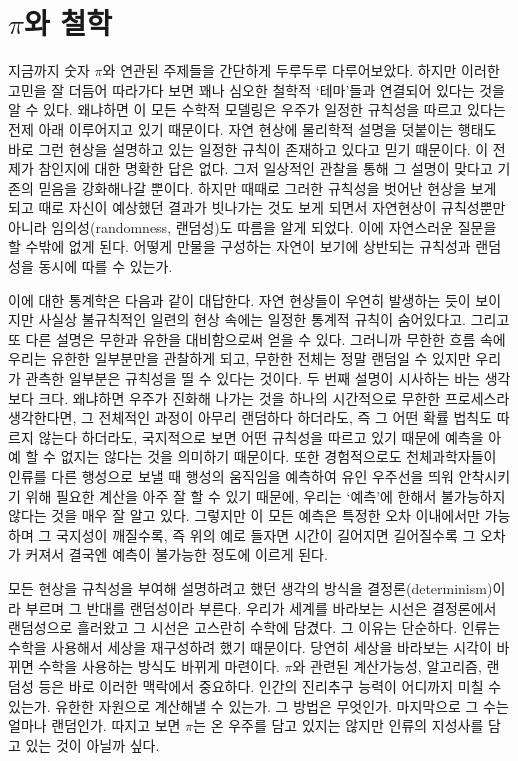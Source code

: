 \documentclass[10pt]{article}
\begin{document}
\section{$\pi$와 철학}
지금까지 숫자 $\pi$와 연관된 주제들을 간단하게 두루두루 다루어보았다. 하지만 이러한 고민을 잘 더듬어 따라가다 보면 꽤나 심오한 철학적 `테마'들과 연결되어 있다는 것을 알 수 있다. 왜냐하면 이 모든 수학적 모델링은 우주가 일정한 규칙성을 따르고 있다는 전제 아래 이루어지고 있기 때문이다. 자연 현상에 물리학적 설명을 덧붙이는 행태도 바로 그런 현상을 설명하고 있는 일정한 규칙이 존재하고 있다고 믿기 때문이다. 이 전제가 참인지에 대한 명확한 답은 없다. 그저 일상적인 관찰을 통해 그 설명이 맞다고 기존의 믿음을 강화해나갈 뿐이다. 하지만 때때로 그러한 규칙성을 벗어난 현상을 보게 되고 때로 자신이 예상했던 결과가 빗나가는 것도 보게 되면서 자연현상이 규칙성뿐만 아니라 임의성(randomness, 랜덤성)도 따름을 알게 되었다. 이에 자연스러운 질문을 할 수밖에 없게 된다. 어떻게 만물을 구성하는 자연이 보기에 상반되는 규칙성과 랜덤성을 동시에 따를 수 있는가. \par
이에 대한 통계학은 다음과 같이 대답한다. 자연 현상들이 우연히 발생하는 듯이 보이지만 사실상 불규칙적인 일련의 현상 속에는 일정한 통계적 규칙이 숨어있다고. 그리고 또 다른 설명은 무한과 유한을 대비함으로써 얻을 수 있다. 그러니까 무한한 흐름 속에 우리는 유한한 일부분만을 관찰하게 되고, 무한한 전체는 정말 랜덤일 수 있지만 우리가 관측한 일부분은 규칙성을 띨 수 있다는 것이다. 두 번째 설명이 시사하는 바는 생각보다 크다. 왜냐하면 우주가 진화해 나가는 것을 하나의 시간적으로 무한한 프로세스라 생각한다면, 그 전체적인 과정이 아무리 랜덤하다 하더라도, 즉 그 어떤 확률 법칙도 따르지 않는다 하더라도, 국지적으로 보면 어떤 규칙성을 따르고 있기 때문에 예측을 아예 할 수 없지는 않다는 것을 의미하기 때문이다. 또한 경험적으로도 천체과학자들이 인류를 다른 행성으로 보낼 때 행성의 움직임을 예측하여 유인 우주선을 띄워 안착시키기 위해 필요한 계산을 아주 잘 할 수 있기 때문에, 우리는 `예측'에 한해서 불가능하지 않다는 것을 매우 잘 알고 있다. 그렇지만 이 모든 예측은 특정한 오차 이내에서만 가능하며 그 국지성이 깨질수록, 즉 위의 예로 들자면 시간이 길어지면 길어질수록 그 오차가 커져서 결국엔 예측이 불가능한 정도에 이르게 된다.\par
모든 현상을 규칙성을 부여해 설명하려고 했던 생각의 방식을 결정론(determinism)이라 부르며 그 반대를 랜덤성이라 부른다. 우리가 세계를 바라보는 시선은 결정론에서 랜덤성으로 흘러왔고 그 시선은 고스란히 수학에 담겼다. 그 이유는 단순하다. 인류는 수학을 사용해서 세상을 재구성하려 했기 때문이다. 당연히 세상을 바라보는 시각이 바뀌면 수학을 사용하는 방식도 바뀌게 마련이다. $\pi$와 관련된 계산가능성, 알고리즘, 랜덤성 등은 바로 이러한 맥락에서 중요하다. 인간의 진리추구 능력이 어디까지 미칠 수 있는가. 유한한 자원으로 계산해낼 수 있는가. 그 방법은 무엇인가. 마지막으로 그 수는 얼마나 랜덤인가. 따지고 보면 $\pi$는 온 우주를 담고 있지는 않지만 인류의 지성사를 담고 있는 것이 아닐까 싶다.
\end{document}

